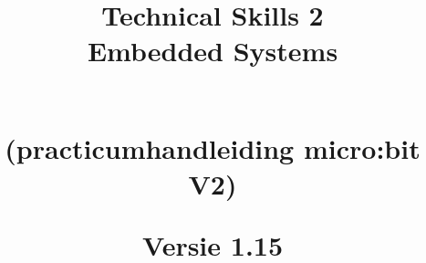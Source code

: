 \documentclass[12pt,openright,twoside]{report}
\date{}
\title{

{\vspace{-4cm}}
	{\hspace{-20pt}\begin{bfseries}\Huge{\color{black}Technical Skills 2 \\Embedded Systems} \end{bfseries}  } \\
	{(practicumhandleiding micro:bit V2)}
\ThisCenterWallPaper{0.8}{figuren/bbcmicrobitV2.png}

	{\vspace{18cm}}	
	{\color{white}  
	\raggedleft  \par}
	Versie 1.15

}
\begin{document}
\maketitle

 \tableofcontents

\let\cleardoublepage\clearpage


%

%



%
%
%






\end{document}
